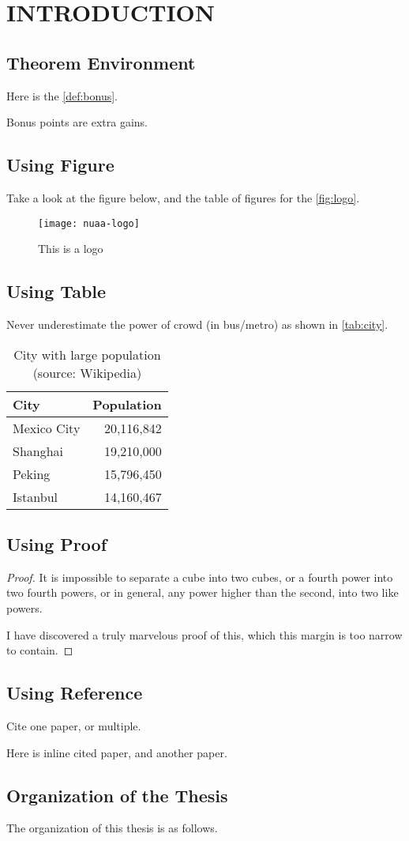 \chapter{INTRODUCTION}

\section{Theorem Environment}
Here is the \autoref{def:bonus}.
\begin{definition}\label{def:bonus}
  Bonus points are extra gains.
\end{definition}

\section{Using Figure}
Take a look at the figure below, and the table of figures for the \autoref{fig:logo}.

\begin{figure}[H]
  \texttt{[image: nuaa-logo]}
  \caption[Demo logo]{This is a logo\label{fig:logo}}
\end{figure}

\section{Using Table}
Never underestimate the power of crowd (in bus/metro) as shown in \autoref{tab:city}.
\begin{table}[htb]
  \caption[City population]{City with large population (source: Wikipedia)\label{tab:city}}
  \begin{tabular}{lr}
    \toprule
    City & Population \\
    \midrule
    Mexico City & 20,116,842\\
    Shanghai & 19,210,000\\
    Peking & 15,796,450\\
    Istanbul & 14,160,467\\
    \bottomrule
  \end{tabular}
\end{table}

\section{Using Proof}
\begin{proof}
It is impossible to separate a cube into two cubes, or a fourth power into two fourth powers,
or in general, any power higher than the second, into two like powers.

I have discovered a truly marvelous proof of this, which this margin is too narrow to contain.
\end{proof}

\section{Using Reference}
Cite one paper\cite{r1}, or multiple\cite{r2,r3,r4}.

Here is inline cited paper, and another paper.

\section{Organization of the Thesis}
The organization of this thesis is as follows.
